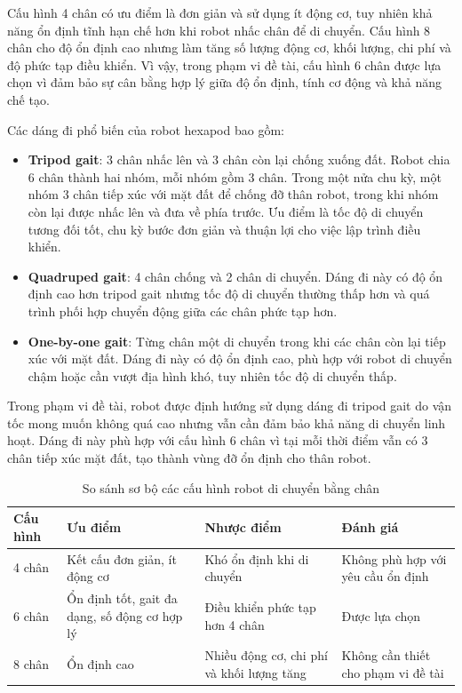             \hspace{0.5cm} Cấu hình 4 chân có ưu điểm là đơn giản và sử dụng ít động cơ, tuy nhiên khả năng ổn định tĩnh hạn chế hơn khi robot nhấc chân để di chuyển. Cấu hình 8 chân cho độ ổn định cao nhưng làm tăng số lượng động cơ, khối lượng, chi phí và độ phức tạp điều khiển. Vì vậy, trong phạm vi đề tài, cấu hình 6 chân được lựa chọn vì đảm bảo sự cân bằng hợp lý giữa độ ổn định, tính cơ động và khả năng chế tạo.

            \hspace{0.5cm} Các dáng đi phổ biến của robot hexapod bao gồm:

            \begin{itemize}
                \item \textbf{Tripod gait}: 3 chân nhấc lên và 3 chân còn lại chống xuống đất. Robot chia 6 chân thành hai nhóm, mỗi nhóm gồm 3 chân. Trong một nửa chu kỳ, một nhóm 3 chân tiếp xúc với mặt đất để chống đỡ thân robot, trong khi nhóm còn lại được nhấc lên và đưa về phía trước. Ưu điểm là tốc độ di chuyển tương đối tốt, chu kỳ bước đơn giản và thuận lợi cho việc lập trình điều khiển.
                \item \textbf{Quadruped gait}: 4 chân chống và 2 chân di chuyển. Dáng đi này có độ ổn định cao hơn tripod gait nhưng tốc độ di chuyển thường thấp hơn và quá trình phối hợp chuyển động giữa các chân phức tạp hơn.
                \item \textbf{One-by-one gait}: Từng chân một di chuyển trong khi các chân còn lại tiếp xúc với mặt đất. Dáng đi này có độ ổn định cao, phù hợp với robot di chuyển chậm hoặc cần vượt địa hình khó, tuy nhiên tốc độ di chuyển thấp.
            \end{itemize}

            \hspace{0.5cm} Trong phạm vi đề tài, robot được định hướng sử dụng dáng đi tripod gait do vận tốc mong muốn không quá cao nhưng vẫn cần đảm bảo khả năng di chuyển linh hoạt. Dáng đi này phù hợp với cấu hình 6 chân vì tại mỗi thời điểm vẫn có 3 chân tiếp xúc mặt đất, tạo thành vùng đỡ ổn định cho thân robot.

            \begin{table}[H]
            \centering
            \caption{So sánh sơ bộ các cấu hình robot di chuyển bằng chân}
            \begin{tabular}{|p{2cm}|p{5cm}|p{5cm}|p{3.5cm}|}
            \hline
            \textbf{Cấu hình} & \textbf{Ưu điểm} & \textbf{Nhược điểm} & \textbf{Đánh giá} \\
            \hline
            4 chân & Kết cấu đơn giản, ít động cơ & Khó ổn định khi di chuyển & Không phù hợp với yêu cầu ổn định \\
            \hline
            6 chân & Ổn định tốt, gait đa dạng, số động cơ hợp lý & Điều khiển phức tạp hơn 4 chân & Được lựa chọn \\
            \hline
            8 chân & Ổn định cao & Nhiều động cơ, chi phí và khối lượng tăng & Không cần thiết cho phạm vi đề tài \\
            \hline
            \end{tabular}
            \end{table}

